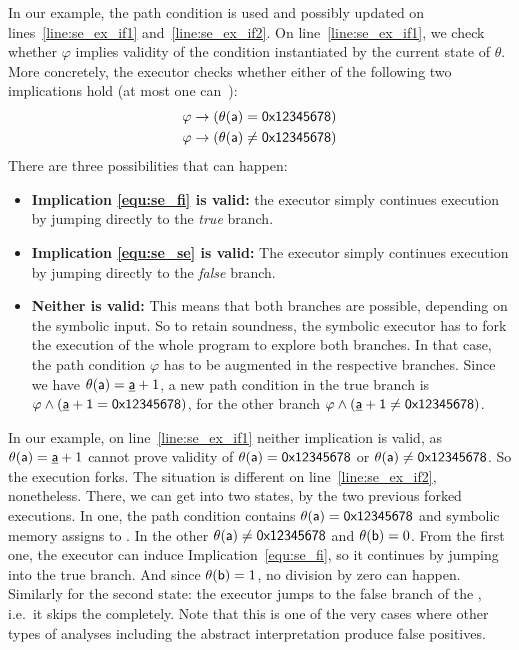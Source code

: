 In our example, the path condition is used and possibly updated on
lines~\ref{line:se_ex_if1} and~\ref{line:se_ex_if2}.  On
line~\ref{line:se_ex_if1}, we check whether $\varphi$ implies validity of the
condition instantiated by the current state of $\theta$. More concretely, the
executor checks whether either of the following two implications hold (at most
one can~\cite{se_king}):
\begin{align}
\varphi & \rightarrow \left( \theta(\mathsf{a}) = \mathsf{0x12345678} \right) \label{equ:se_fi} \\
\varphi & \rightarrow \left( \theta(\mathsf{a}) \neq \mathsf{0x12345678} \right) \label{equ:se_se}
\end{align}
There are three possibilities that can happen:
\begin{itemize}
\item \textbf{Implication \ref{equ:se_fi} is valid:} the executor simply
continues execution by jumping directly to the \emph{true} branch.

\item \textbf{Implication \ref{equ:se_se} is valid:} The executor simply
continues execution by jumping directly to the \emph{false} branch.

\item \textbf{Neither is valid:} This means that both branches are possible,
depending on the symbolic input.  So to retain soundness, the symbolic
executor has to fork the execution of the whole program to explore both
branches. In that case, the path condition $\varphi$ has to be augmented in
the respective branches. Since we have $\theta(\mathsf{a})=\underline{\mathsf{a}}+1$, a new path
condition in the true branch is $\varphi \wedge (\underline{\mathsf{a}}+\mathsf{1} =
\mathsf{0x12345678})$, for the other branch $\varphi \wedge (\underline{\mathsf{a}}+\mathsf{1} \neq
\mathsf{0x12345678})$.

\end{itemize}
In our example, on line~\ref{line:se_ex_if1} neither implication is valid, as
$\theta(\mathsf{a})=\underline{\mathsf{a}}+1$ cannot prove validity of $\theta(\mathsf{a}) =
\mathsf{0x12345678}$ or $\theta(\mathsf{a}) \neq \mathsf{0x12345678}$. So the execution
forks.  The situation is different on line~\ref{line:se_ex_if2}, nonetheless.
There, we can get into two states, by the two previous forked executions. In
one, the path condition contains $\theta(\mathsf{a}) = \mathsf{0x12345678}$ and
symbolic memory assigns  to . In the other $\theta(\mathsf{a})
\neq \mathsf{0x12345678}$ and $\theta(\mathsf{b}) = 0$. From the first one, the
executor can induce Implication~\ref{equ:se_fi}, so it continues by jumping
into the true branch.  And since $\theta(\mathsf{b}) = 1$, no division by zero
can happen.  Similarly for the second state: the executor jumps to the false
branch of the , i.e.~it skips the  completely. Note that
this is one of the very cases where other types of analyses including the
abstract interpretation produce false positives.

